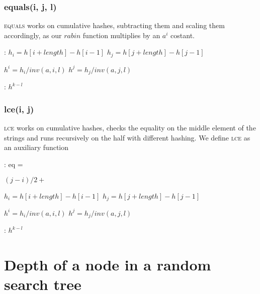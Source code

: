\documentclass{article}
\begin{document}
\subsubsection{equals(i, j, l)}

\textsc{equals} works on cumulative hashes, subtracting them and scaling them
accordingly, as our $rabin$ function multiplies by an $a^{i}$ costant.

\begin{algorithmic}[1]
  :
    \State $h_i = h[i + length] - h[i - 1]$\;
    \State $h_j = h[j + length] - h[j - 1]$\;

    \State $h^{i} = h_i / inv(a, i, l)$\;
    \State $h^{j} = h_j / inv(a, j, l)$\;

    \;
    \EndFunction

    :
    \Return $h^{k - l}$
    \EndFunction
\end{algorithmic}

\subsubsection{lce(i, j)}

\textsc{lce} works on cumulative hashes, checks the equality on the middle element
of the strings and runs recursively on the half with different hashing.
We define \textsc{lce} as an auxiliary function

\begin{algorithmic}[1]
  :
    \State eq = \;

        \Else $(j - i) / 2 + $      %
    \EndIf

    \State $h_i = h[i + length] - h[i - 1]$\;
    \State $h_j = h[j + length] - h[j - 1]$\;

    \State $h^{i} = h_i / inv(a, i, l)$\;
    \State $h^{j} = h_j / inv(a, j, l)$\;

    \;
    \EndFunction

    :
    \Return $h^{k - l}$
    \EndFunction
\end{algorithmic}


\newpage
\section{Depth of a node in a random search tree}
\end{document}

